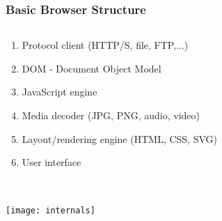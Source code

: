 \documentclass[
	notes=none,
	aspectratio=169
]{beamer}
\begin{document}

\begin{frame}
\frametitle{Basic Browser Structure}

\begin{columns}[T]
\begin{column}[T]{1.0\textwidth}
\setlength{\parskip}{0.5em}

\vspace{1.5cm}
\begin{enumerate}
\setlength{\parskip}{0.5em}
\item Protocol client (HTTP/S, file, FTP,...)
\item DOM - Document Object Model
\item JavaScript engine
\item Media decoder (JPG, PNG, audio, video)
\item Layout/rendering engine (HTML, CSS, SVG)
\item User interface
\end{enumerate}

\end{column}
\end{columns}

\end{frame}
\note{
\begin{enumerate}
\item -
\end{enumerate}
}


\begin{frame}
\frametitle{}

\begin{columns}[T]
\begin{column}[T]{1.0\textwidth}

\vspace{0.2cm}
\texttt{[image: internals]}

\end{column}
\end{columns}

\end{frame}

\end{document}
